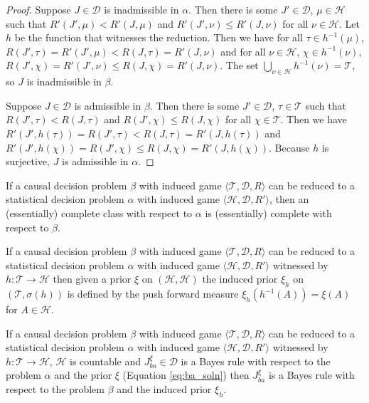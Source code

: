 \begin{proof}
Suppose $J\in\mathscr{D}$ is inadmissible in $\alpha$. Then there is some $J'\in\mathscr{D}$, $\mu\in\mathscr{H}$ such that $R'(J',\mu)<R'(J,\mu)$ and $R'(J',\nu)\leq R'(J,\nu)$ for all $\nu\in \mathscr{H}$. Let $h$ be the function that witnesses the reduction. Then we have for all $\tau\in h^{-1}(\mu)$, $R(J',\tau)=R'(J',\mu)<R(J,\tau)=R'(J,\nu)$ and for all $\nu\in \mathscr{H}$, $\chi\in h^{-1}(\nu)$, $R(J',\chi)=R'(J',\nu)\leq R(J,\chi)=R'(J,\nu)$. The set $\bigcup_{\nu\in\mathscr{H}} h^{-1}(\nu)=\mathscr{T}$, so $J$ is inadmissible in $\beta$.

Suppose $J\in \mathscr{D}$ is admissible in $\beta$. Then there is some $J'\in\mathscr{D}$, $\tau\in\mathscr{T}$ such that $R(J',\tau)<R(J,\tau)$ and $R(J',\chi)\leq R(J,\chi)$ for all $\chi\in \mathscr{T}$. Then we have $R'(J',h(\tau))=R(J',\tau)<R(J,\tau)=R'(J,h(\tau))$ and $R'(J',h(\chi))=R(J',\chi)\leq R(J,\chi)=R'(J,h(\chi))$. Because $h$ is surjective, $J$ is admissible in $\alpha$.
\end{proof}

\begin{corollary}\label{cor:red_comp}
If a causal decision problem $\beta$ with induced game $\langle \mathscr{T},\mathscr{D}, R\rangle$ can be reduced to a statistical decision problem $\alpha$ with induced game $\langle \mathscr{H},\mathscr{D},R' \rangle$, then an (essentially) complete class with respect to $\alpha$ is (essentially) complete with respect to $\beta$.
\end{corollary}

\begin{definition}
If a causal decision problem $\beta$ with induced game $\langle \mathscr{T},\mathscr{D}, R\rangle$ can be reduced to a statistical decision problem $\alpha$ with induced game $\langle \mathscr{H},\mathscr{D},R' \rangle$ witnessed by $h:\mathscr{T}\to\mathscr{H}$ then given a prior $\xi$ on $(\mathscr{H},\mathcal{H})$ the induced prior $\xi_h$ on $(\mathscr{T},\sigma(h))$ is defined by the push forward measure $\xi_h(h^{-1}(A)) = \xi(A)$ for $A\in \mathcal{H}$.
\end{definition}

\begin{lemma}\label{lem:IB_rule}
If a causal decision problem $\beta$ with induced game $\langle \mathscr{T},\mathscr{D}, R\rangle$ can be reduced to a statistical decision problem $\alpha$ with induced game $\langle \mathscr{H},\mathscr{D},R' \rangle$ witnessed by $h:\mathscr{T}\to\mathscr{H}$, $\mathscr{H}$ is countable and $J_{ba}^\xi\in \mathscr{D}$ is a Bayes rule with respect to the problem $\alpha$ and the prior $\xi$ (Equation \ref{eq:ba_soln}) then $J_{ba}^\xi$ is a Bayes rule with respect to the problem $\beta$ and the induced prior $\xi_h$.
\end{lemma}

